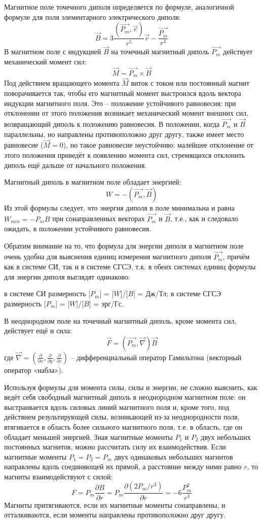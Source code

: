 \documentclass[14pt]{article}
\begin{document}
Магнитное поле точечного диполя определяется по формуле, аналогичной формуле для поля элементарного электрического диполя:
$$
	\vec{B} = 3\frac{(\vec{P_m},\vec{r})}{r^5}\vec{r} - \frac{\vec{P_m}}{r^3}
$$
В магнитном поле с индукцией $\vec{B}$ на точечный магнитный диполь $\vec{P_m}$ действует механический момент сил:
$$
	\vec{M} = \vec{P_m}\times\vec{B}
$$
Под действием вращающего момента $\vec{M}$ виток с током или постоянный магнит поворачивается так, чтобы его магнитный момент выстроился вдоль вектора индукции магнитного поля. Это -- положение устойчивого равновесия: при отклонении от этого положения возникает механический момент внешних сил, возвращающий диполь к положению равновесия. В положении, когда $\vec{P_m}$ и $\vec{B}$ параллельны, но направлены противоположно друг другу, также имеет место равновесие ($\vec{M} = 0$), но такое равновесие неустойчиво: малейшее отклонение от этого положения приведёт к появлению момента сил, стремящихся отклонить диполь ещё дальше от начального положения.

Магнитный диполь в магнитном поле обладает энергией:
$$
	W = -(\vec{P_m},\vec{B})
$$
Из этой формулы следует, что энергия диполя в поле минимальна и равна $W_{min} = -P_mB$ при сонаправленных векторах $\vec{P_m}$ и $\vec{B}$, т.е., как и следовало ожидать, в положении устойчивого равновесия. 

Обратим внимание на то, что формула для энергии диполя в магнитном поле очень удобна для выяснения единиц измерения магнитного диполя
$\vec{P_m}$, причём как в системе СИ, так и в системе СГСЭ, т.к. в обеих системах единиц формулы для энергии диполя выглядят одинаково:

в системе СИ размерность [$P_m$] = [$W$]/[$B$] = Дж/Тл;
в системе СГСЭ размерность [$P_m$] = [$W$]/[$B$] = эрг/Гс.

В неоднородном поле на точечный магнитный диполь, кроме момента сил, действует ещё и сила:
$$
	\vec{F} = (\vec{P_m},\vec{\nabla})\vec{B}
$$
где $\vec{\nabla} = (\frac{\partial}{\partial x}, \frac{\partial}{\partial y}, \frac{\partial}{\partial z})$ -- дифференциальный оператор Гамильтона (векторный оператор «набла»).

Используя формулы для момента силы, силы и энергии, не сложно выяснить, как ведёт себя свободный магнитный диполь в неоднородном магнитном поле: он выстраивается вдоль силовых линий магнитного поля и, кроме того, под действием результирующей силы, возникающей из-за неоднородности поля, втягивается в область более сильного магнитного поля, т.е. в область, где он обладает меньшей энергией. Зная магнитные моменты $P_1$ и $P_2$ двух небольших постоянных магнитов, можно рассчитать силу их взаимодействия. Если магнитные моменты $P_1 = P_2 = P_m$ двух одинаковых небольших магнитов направлены вдоль соединяющей их прямой, а расстояние между ними равно $r$, то магниты взаимодействуют
с силой:
$$
	F = P_m\frac{\partial B}{\partial r} = P_m\frac{\partial(2P_m/r^3)}{\partial r} = -6\frac{P_m^2}{r^4}
$$
Магниты притягиваются, если их магнитные моменты сонаправлены, и отталкиваются, если моменты направлены противоположно друг другу.
\end{document}
